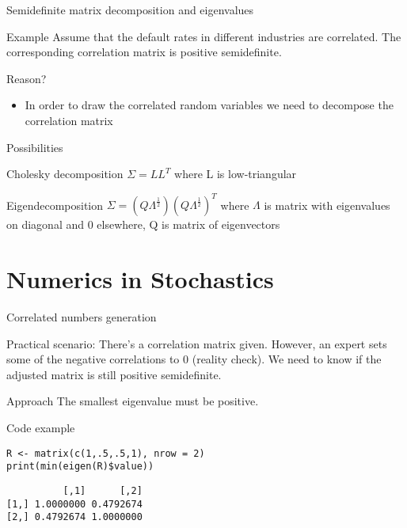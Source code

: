\documentclass[presentation]{beamer}
\begin{document}
\begin{frame}[label=sec-2-6]{Semidefinite matrix decomposition and eigenvalues}
\begin{block}{Example}
Assume that the default rates in different industries are correlated. The corresponding correlation matrix is positive semidefinite.
\end{block}
\begin{block}{Reason?}
\begin{itemize}
\item In order to draw the correlated random variables we need to decompose the correlation matrix
\end{itemize}
\end{block}
\begin{block}{Possibilities}
\begin{block}{Cholesky decomposition}
$\Sigma = LL^T$ where L is low-triangular
\end{block}
\begin{block}{Eigendecomposition}
$\Sigma = (Q\Lambda^{\frac{1}{2}})(Q\Lambda^{\frac{1}{2}})^T$ where $\Lambda$ is matrix with eigenvalues on diagonal and 0 elsewhere, Q is matrix of eigenvectors
\end{block}
\end{block}
\end{frame}
\section{Numerics in Stochastics}
\label{sec-3}
\begin{frame}[fragile,label=sec-3-1]{Correlated numbers generation}
 \begin{block}{Practical scenario:}
There's a correlation matrix given. However, an expert sets some of the negative correlations to 0 (reality check).
We need to know if the adjusted matrix is still positive semidefinite.
\end{block}
\begin{block}{Approach}
The smallest eigenvalue must be positive.
\end{block}
\begin{block}{Code example}
\begin{verbatim}
R <- matrix(c(1,.5,.5,1), nrow = 2)
print(min(eigen(R)$value))
\end{verbatim}

\begin{verbatim}
          [,1]      [,2]
[1,] 1.0000000 0.4792674
[2,] 0.4792674 1.0000000
\end{verbatim}
\end{block}
\end{frame}
\end{document}
